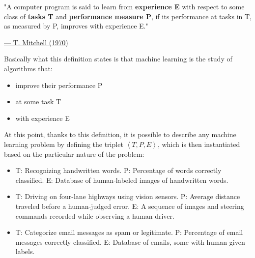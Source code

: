 \vspace{5mm}

\begin{quoting}
    "A computer program is said to learn from \textbf{experience E} with
    respect to some class of \textbf{tasks T} and \textbf{performance
        measure P}, if its performance at tasks in T, as measured by P,
    improves with experience E."
\end{quoting}

\hspace{310pt}
\href{https://en.wikipedia.org/wiki/Tom_M._Mitchell}{--- \underline{T. Mitchell (1970)}}

\vspace{10mm}

Basically what this definition states is that machine learning is the
study of algorithms that:

\begin{itemize}
    \item improve their performance P
    \item at some task T
    \item with experience E
\end{itemize}

\vspace{5mm}

At this point, thanks to this definition, it is possible to describe any
machine learning problem by defining the triplet
$\left\langle T,P,E\right\rangle$,
which is then instantiated based on the particular
nature of the problem:

\begin{itemize}
    \item
          \begin{example}
              T: Recognizing handwritten words.
              P: Percentage of words correctly classified.
              E: Database of human-labeled images of handwritten words.
          \end{example}
    \item
          \begin{example}
              T: Driving on four-lane highways using vision sensors.
              P: Average distance traveled before a human-judged error.
              E: A sequence of images and steering commands recorded
              while observing a human driver.
          \end{example}
    \item
          \begin{example}
              T: Categorize email messages as spam or legitimate.
              P: Percentage of email messages correctly classified.
              E: Database of emails, some with human-given labels.
          \end{example}
\end{itemize}

